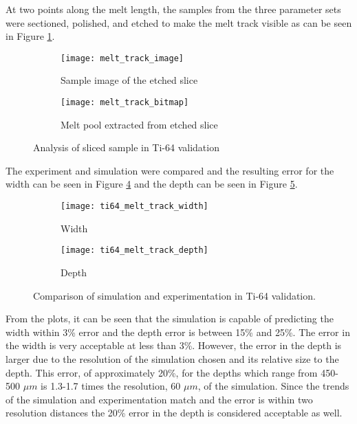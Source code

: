 At two points along the melt length, the samples from the three parameter sets were sectioned, polished, and etched to make the melt track visible as can be seen in Figure \ref{fig:melt_track_image}.  
\begin{figure}[!htb]
	\centering
		\begin{subfigure}{0.495\textwidth}
		\texttt{[image: melt\_track\_image]}
		\caption{Sample image of the etched slice}
		\label{fig:melt_track_image}
		\end{subfigure}
			\begin{subfigure}{0.495\textwidth}
			\texttt{[image: melt\_track\_bitmap]}
			\caption{Melt pool extracted from etched slice}
			\label{fig:melt_track_bitmap}
			\end{subfigure}
	\caption{Analysis of sliced sample in Ti-64 validation}
	\label{fig:melt_track}
\end{figure}

The experiment and simulation were compared and the resulting error for the width can be seen in Figure \ref{fig:ti64_melt_track_width} and the depth can be seen in Figure \ref{fig:ti64_melt_track_depth}.
\begin{figure}[!htb]\centering
	\begin{subfigure}[c]{0.45\textwidth}\centering
	\texttt{[image: ti64\_melt\_track\_width]}
	\caption{Width}
	\label{fig:ti64_melt_track_width}
	\end{subfigure}\hfill{}
		\begin{subfigure}[c]{0.45\textwidth}\centering
		\texttt{[image: ti64\_melt\_track\_depth]}
		\caption{Depth}
		\label{fig:ti64_melt_track_depth}
		\end{subfigure}
	\caption{Comparison of simulation and experimentation in Ti-64 validation.}
	\label{fig:ti64_melt_track}
\end{figure}
From the plots, it can be seen that the simulation is capable of predicting the width within 3\% error and the depth error is between 15\% and 25\%.  The error in the width is very acceptable at less than 3\%.
However, the error in the depth is larger due to the resolution of the simulation chosen and its relative size to the depth.  This error, of approximately 20\%, for the depths which range from 450-500 $\mu m$ is 1.3-1.7 times the resolution, 60 $\mu m$, of the simulation.  Since the trends of the simulation and experimentation match and the error is within two resolution distances the 20\% error in the depth is considered acceptable as well. 
